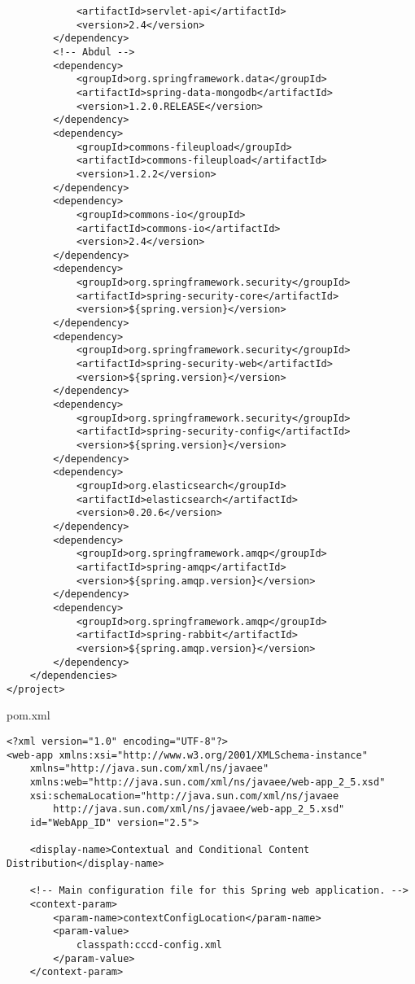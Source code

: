 \begin{appendix}
\begin{code}
\begin{verbatim}
			<artifactId>servlet-api</artifactId>
			<version>2.4</version>
		</dependency>
		<!-- Abdul -->
		<dependency>
			<groupId>org.springframework.data</groupId>
			<artifactId>spring-data-mongodb</artifactId>
			<version>1.2.0.RELEASE</version>
		</dependency>
		<dependency>
			<groupId>commons-fileupload</groupId>
			<artifactId>commons-fileupload</artifactId>
			<version>1.2.2</version>
		</dependency>
		<dependency>
			<groupId>commons-io</groupId>
			<artifactId>commons-io</artifactId>
			<version>2.4</version>
		</dependency>
		<dependency>
			<groupId>org.springframework.security</groupId>
			<artifactId>spring-security-core</artifactId>
			<version>${spring.version}</version>
		</dependency>
		<dependency>
			<groupId>org.springframework.security</groupId>
			<artifactId>spring-security-web</artifactId>
			<version>${spring.version}</version>
		</dependency>
		<dependency>
			<groupId>org.springframework.security</groupId>
			<artifactId>spring-security-config</artifactId>
			<version>${spring.version}</version>
		</dependency>
		<dependency>
			<groupId>org.elasticsearch</groupId>
			<artifactId>elasticsearch</artifactId>
			<version>0.20.6</version>
		</dependency>
		<dependency>
			<groupId>org.springframework.amqp</groupId>
			<artifactId>spring-amqp</artifactId>
			<version>${spring.amqp.version}</version>
		</dependency>
		<dependency>
			<groupId>org.springframework.amqp</groupId>
			<artifactId>spring-rabbit</artifactId>
			<version>${spring.amqp.version}</version>
		</dependency>
	</dependencies>
</project>
\end{verbatim}
\caption{pom.xml}
\label{lst:pom.xml}
\end{code}

\newpage

\begin{code}
\begin{verbatim}
<?xml version="1.0" encoding="UTF-8"?>
<web-app xmlns:xsi="http://www.w3.org/2001/XMLSchema-instance"
	xmlns="http://java.sun.com/xml/ns/javaee" 
	xmlns:web="http://java.sun.com/xml/ns/javaee/web-app_2_5.xsd"
	xsi:schemaLocation="http://java.sun.com/xml/ns/javaee 
		http://java.sun.com/xml/ns/javaee/web-app_2_5.xsd"
	id="WebApp_ID" version="2.5">

	<display-name>Contextual and Conditional Content Distribution</display-name>

	<!-- Main configuration file for this Spring web application. -->
	<context-param>
		<param-name>contextConfigLocation</param-name>
		<param-value>
			classpath:cccd-config.xml
		</param-value>
	</context-param>


\end{verbatim}
\end{code}
\end{appendix}
